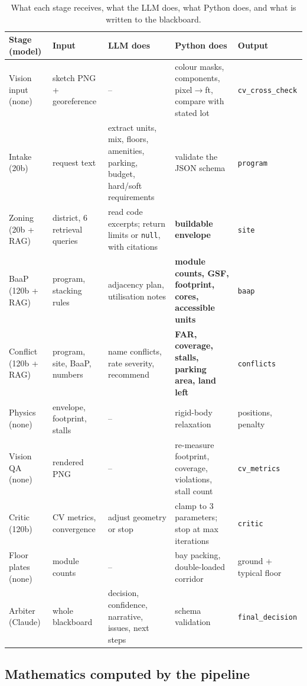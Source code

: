 \documentclass[10pt,a4paper]{article}
\newcommand{\code}[1]{\texttt{\small #1}}
\theoremstyle{definition}
\begin{document}
\begin{table}[H]
\centering\scriptsize
\caption{What each stage receives, what the LLM does, what Python does, and what is written to the blackboard.}
\label{tab:agents}
\begin{tabularx}{\linewidth}{@{}>{\raggedright\arraybackslash}p{2.5cm} >{\raggedright\arraybackslash}p{2.4cm} >{\raggedright\arraybackslash}X >{\raggedright\arraybackslash}X >{\raggedright\arraybackslash}p{1.9cm}@{}}
\toprule
\textbf{Stage (model)} & \textbf{Input} & \textbf{LLM does} & \textbf{Python does} & \textbf{Output} \\ \midrule
Vision input (none) & sketch PNG + georeference & -- & colour masks, components, pixel$\to$ft, compare with stated lot & \code{cv\_cross\_check} \\
Intake (20b) & request text & extract units, mix, floors, amenities, parking, budget, hard/soft requirements & validate the JSON schema & \code{program} \\
Zoning (20b + RAG) & district, 6 retrieval queries & read code excerpts; return limits or \code{null}, with citations & \textbf{buildable envelope} & \code{site} \\
BaaP (120b + RAG) & program, stacking rules & adjacency plan, utilisation notes & \textbf{module counts, GSF, footprint, cores, accessible units} & \code{baap} \\
Conflict (120b + RAG) & program, site, BaaP, numbers & name conflicts, rate severity, recommend & \textbf{FAR, coverage, stalls, parking area, land left} & \code{conflicts} \\
Physics (none) & envelope, footprint, stalls & -- & rigid-body relaxation & positions, penalty \\
Vision QA (none) & rendered PNG & -- & re-measure footprint, coverage, violations, stall count & \code{cv\_metrics} \\
Critic (120b) & CV metrics, convergence & adjust geometry or stop & clamp to 3 parameters; stop at max iterations & \code{critic} \\
Floor plates (none) & module counts & -- & bay packing, double-loaded corridor & ground + typical floor \\
Arbiter (Claude) & whole blackboard & decision, confidence, narrative, issues, next steps & schema validation & \code{final\_decision} \\
\bottomrule
\end{tabularx}
\end{table}

\subsection{Mathematics computed by the pipeline}
\end{document}
